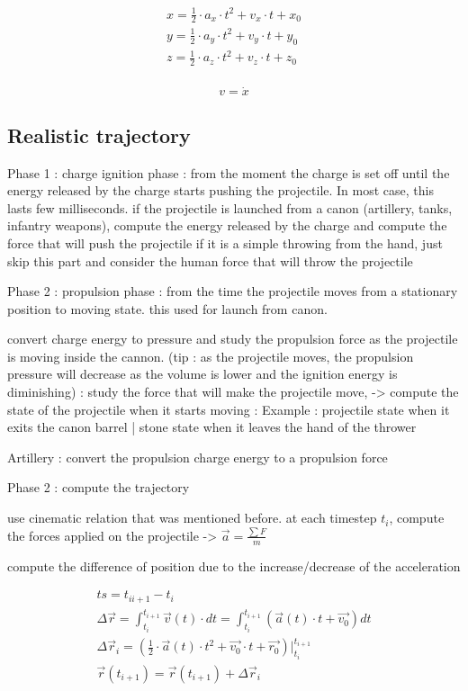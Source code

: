 \documentclass[12pt,a4paper]{article}
\begin{document}
\begin{eqnarray}
	x = \frac{1}{2} \cdot a_x \cdot t^2 + v_x \cdot t + x_0 \\
	y = \frac{1}{2} \cdot a_y \cdot t^2 + v_y \cdot t + y_0 \\
	z = \frac{1}{2} \cdot a_z \cdot t^2 + v_z \cdot t + z_0 \\
\end{eqnarray}

\begin{equation}
	v = \dot{x}
\end{equation}


\subsection{Realistic trajectory}

Phase 1 : charge ignition phase : from the moment the charge is set off until the energy released by the charge starts pushing the projectile. In most case, this lasts few milliseconds.
if the projectile is launched from a canon (artillery, tanks, infantry weapons), compute the energy released by the charge and compute the force that will push the projectile
if it is a simple throwing from the hand, just skip this part and consider the human force that will throw the projectile

Phase 2 : propulsion phase : from the time the projectile moves from a stationary position to moving state. this used for launch from canon.

convert charge energy to pressure and study the propulsion force as the projectile is moving inside the cannon.
(tip : as the projectile moves, the propulsion pressure will decrease as the volume is lower and the ignition energy is diminishing)
: study the force that will make the projectile move, -> compute the state of the projectile when it starts moving :
Example : projectile state when it exits the canon barrel | stone state when it leaves the hand of the thrower

Artillery : convert the propulsion charge energy to a propulsion force

Phase 2 : compute the trajectory

use cinematic relation that was mentioned before.
at each timestep $t_i$, compute the forces applied on the projectile -> $\vec{a} = \frac{ \sum F}{m}$

compute the difference of position due to the increase/decrease of the acceleration

\begin{eqnarray}
	ts = t_{ii+1} - t_i\\
	\Delta \vec{r} = \int_{t_i}^{t_{i+1}}  \vec{v}(t) \cdot dt = \int_{t_i}^{t_{i+1}}  (\vec{a}(t) \cdot t + \vec{v_0}) dt\\
	\Delta \vec{r}_i = (\frac{1}{2} \cdot \vec{a}(t) \cdot t^2 + \vec{v_0} \cdot t + \vec{r_0}) \bigg|_{t_i}^{t_{i+1}}\\
	\vec{r}(t_{i+1}) = \vec{r}(t_{i+1}) + \Delta \vec{r}_i
\end{eqnarray}
\end{document}
